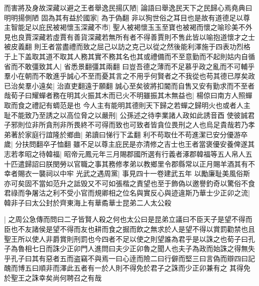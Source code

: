 而害將及身故深藏以避之王者舉逸民揚仄陋|{
	論語曰舉逸民天下之民歸心焉堯典曰明明揚側陋}
固為其有益於國家|{
	為于偽翻}
非以狥世俗之耳目也是故有道德足以尊主智能足以庇民被褐懷玉深藏不市|{
	聖人被褐懷玉玉至寶也被褐而懷之喻珍美不外見也良賈深藏若虛賈有善貨深藏若無所有者不得善賈則不售此皆以喻抱道懷才之士被皮義翻}
則王者當盡禮而致之屈己以訪之克己以從之然後能利澤施于四表功烈格于上下盖取其道不取其人務其實不務其名也其或禮備而不至意勤而不起則姑内自循省而不敢彊致其人|{
	省悉景翻彊其兩翻}
曰豈吾德之薄而不足慕乎政之亂而不可輔乎羣小在朝而不敢進乎誠心不至而憂其言之不用乎何賢者之不我從也苟其德已厚矣政已治矣羣小遠矣|{
	治直吏翻遠于願翻}
誠心至矣彼將扣閽而自售又安有勤求而不至者哉荀子曰耀蟬者務在明其火振其木而已火不明雖振其木無益也|{
	楊倞曰南方人照蟬取而食之禮記有蜩范是也}
今人主有能明其德則天下歸之若蟬之歸明火也或者人主耻不能致乃至誘之以高位脅之以嚴刑|{
	公孫述之待李業諸人政如此誘音酉}
使彼誠君子邪則位非所貪刑非所畏終不可得而致也可致者皆貪位畏刑之人也烏足貴哉若乃孝弟著於家庭行誼隆於鄉曲|{
	弟讀曰悌行下孟翻}
利不苟取仕不苟進潔已安分優游卒歲|{
	分扶問翻卒子恤翻}
雖不足以尊主庇民是亦清修之吉士也王者當褒優安養俾遂其志若孝昭之待韓福|{
	昭帝元鳳元年三月賜郡國所選有行義者涿郡韓福等五人帛人五十匹遣歸詔曰朕閔勞以官職之事其務修孝弟以教鄉里令郡縣常以正月賜羊酒其有不幸者賜衣一襲祠以中牢}
光武之遇周黨|{
	事見四十一卷建武五年}
以勵廉耻美風俗斯亦可矣固不當如范升之詆毁又不可如張楷之責望也至于飾偽以邀譽釣奇以驚俗不食君祿而争屠沽之利不受小官而規卿相之位名與實反心與迹違斯乃華士少正卯之流|{
	韓非子曰太公封於齊東海上有華矞華士昆弟二人太公殺}


|{
	之周公急傳而問曰二子皆賢人殺之何也太公曰是昆弟立議曰不臣天子是望不得而臣也不友諸侯是望不得而友也耕而食之掘而飲之無求於人是望不得以賞罰勸禁也且聖王所以使人非爵賞則刑罰也今四者不足以使之則望誰為君乎是以誅之也荀子曰孔子為魯相七日而誅少正卯門人進問曰夫少正卯魯之聞人也夫子為政而始誅之得無失乎孔子曰其有惡者五而盗竊不與焉一曰心逹而險二曰行僻而堅三曰言偽而辯四曰記醜而博五曰順非而澤此五者有一於人則不得免於君子之誅而少正卯兼有之}
其得免於聖王之誅幸矣尚何聘召之有哉

